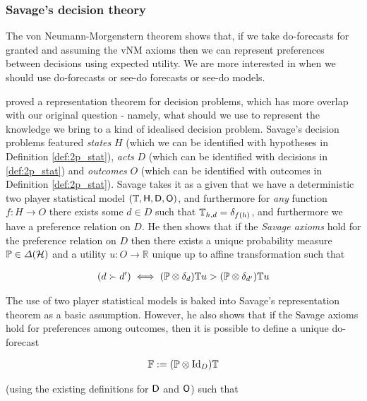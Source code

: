 
\subsubsection{Savage's decision theory}

The von Neumann-Morgenstern theorem shows that, if we take do-forecasts for granted and assuming the vNM axioms then we can represent preferences between decisions using expected utility. We are more interested in when we should use do-forecasts or see-do forecasts or see-do models. 

\citet{savage_foundations_1954} proved a representation theorem for decision problems, which has more overlap with our original question - namely, what should we use to represent the knowledge we bring to a kind of idealised decision problem. Savage's decision problems featured \emph{states} $H$ (which we can be identified with hypotheses in Definition \ref{def:2p_stat}), \emph{acts} $D$ (which can be identified with decisions in \ref{def:2p_stat}) and \emph{outcomes} $O$ (which can be identified with outcomes in Definition \ref{def:2p_stat}). Savage takes it as a given that we have a deterministic two player statistical model $(\mathbb{T},\mathsf{H},\mathsf{D},\mathsf{O})$, and furthermore for \emph{any} function $f:H\to O$ there exists some $d\in D$ such that $\mathbb{T}_{h,d} = \delta_{f(h)}$, and furthermore we have a preference relation on $D$. He then shows that if the \emph{Savage axioms} hold for the preference relation on $D$ then there exists a unique probability measure $\mathbb{P}\in \Delta(\mathcal{H})$ and a utility $u:O\to \mathbb{R}$ unique up to affine transformation such that

\begin{align}
(d\succ d')\iff (\mathbb{P}\otimes \delta_d)\mathbb{T} u > (\mathbb{P}\otimes \delta_{d'})\mathbb{T} u\label{eq:savage_utility}
\end{align}

The use of two player statistical models is baked into Savage's representation theorem as a basic assumption. However, he also shows that if the Savage axioms hold for preferences among outcomes, then it is possible to define a unique do-forecast

\begin{align}
    \mathbb{F}:=(\mathbb{P}\otimes \mathrm{Id}_D)\mathbb{T}
\end{align}

(using the existing definitions for $\mathsf{D}$ and $\mathsf{O}$) such that

